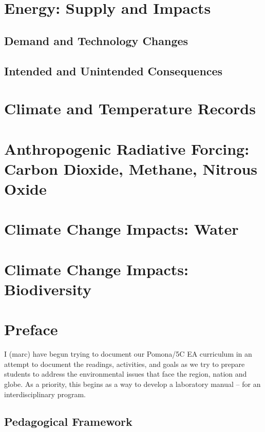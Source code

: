 \documentclass{tufte-book}\usepackage[]{graphicx}\usepackage[]{xcolor}
\begin{document}
\chapter{Energy: Supply and Impacts}

\section{Demand and Technology Changes}

\section{Intended and Unintended Consequences}

\chapter{Climate and Temperature Records}


\chapter{Anthropogenic Radiative Forcing: Carbon Dioxide, Methane, Nitrous Oxide}

\chapter{Climate Change Impacts: Water}

\chapter{Climate Change Impacts: Biodiversity}




\chapter*{Preface}

 I (marc) have begun trying to document our Pomona/5C EA curriculum in an attempt to document the readings, activities, and goals as we try to prepare students to address the environmental issues that face the region, nation and globe. As a priority, this begins as a way to develop a laboratory manual -- for an interdisciplinary program.

\section{Pedagogical Framework}
\end{document}
